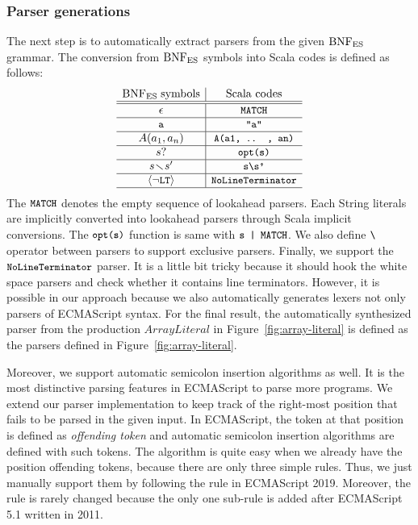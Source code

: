 \subsubsection{Parser generations}\label{sec:convert-bnfes}
The next step is to automatically extract parsers from the given \( \text{BNF}_{\text{ES}} \) grammar.
The conversion from \( \text{BNF}_{\text{ES}} \) symbols into Scala codes is defined as follows:
\[
  \begin{array}{c|c}
    \text{BNF}_{\text{ES}} \; \text{symbols} & \text{Scala codes}\\\hline\hline
    \epsilon & \texttt{\small MATCH}\\\hline
    \texttt{\small a} & \texttt{\small"a"}\\\hline
    A(a_1, a_n) & \texttt{\small A(a1, .. , an)}\\\hline
    s? & \texttt{\small opt(s)}\\\hline
    s \!\smallsetminus\! s' & \texttt{\small s\textbackslash s'}\\\hline
    \left<\neg\texttt{\small LT}\right> & \texttt{\small NoLineTerminator}\\\hline
  \end{array}
\]
The \( \texttt{\small MATCH} \) denotes the empty sequence of lookahead parsers.
Each String literals are implicitly converted into lookahead parsers
through Scala implicit conversions. The \( \texttt{\small opt(s)} \) function
is same with \( \texttt{\small s | MATCH} \). We also define \( \texttt{\small\textbackslash} \)
operator between parsers to support exclusive parsers.
Finally, we support the \( \texttt{\small NoLineTerminator} \) parser.
It is a little bit tricky because it should hook the white space parsers
and check whether it contains line terminators.
However, it is possible in our approach because
we also automatically generates lexers not only parsers of ECMAScript syntax.
For the final result, the automatically synthesized parser from the
production \( ArrayLiteral \) in Figure~\ref{fig:array-literal} is defined
as the parsers defined in Figure~\ref{fig:array-literal}.

Moreover, we support automatic semicolon insertion algorithms as well.
It is the most distinctive parsing features in ECMAScript to parse more programs.
We extend our parser implementation to keep track of the right-most position
that fails to be parsed in the given input. In ECMAScript, the token at that
position is defined as \textit{offending token} and automatic semicolon insertion
algorithms are defined with such tokens. The algorithm is quite easy when we
already have the position offending tokens, because there are only three simple
rules. Thus, we just manually support them by following the rule in ECMAScript 2019.
Moreover, the rule is rarely changed because the only one sub-rule is added
after ECMAScript 5.1 written in 2011.
